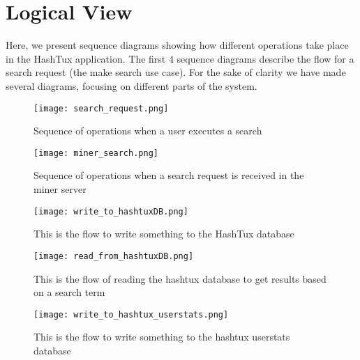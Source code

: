 \chapter{Logical View}
Here, we present sequence diagrams showing how different operations take place
in the HashTux application. \newline
The first 4 sequence diagrams describe the flow for a search request (the make
search use case). For the sake of clarity we have made several diagrams,
focusing on different parts of the system.
\newpage
\begin{figure}[ht]
  \centering
  \texttt{[image: search\_request.png]}
  \caption{Sequence of operations when a user executes a search}
\end{figure}
\newpage
\begin{figure}[ht]
  \centering
  \texttt{[image: miner\_search.png]}
  \caption{Sequence of operations when a search request is received in the miner
     server}
\end{figure}
\newpage
\begin{figure}[ht]
  \centering
  \texttt{[image: write\_to\_hashtuxDB.png]}
  \caption{This is the flow to write something to the HashTux database}
\end{figure}
\begin{figure}[ht]
  \centering
  \texttt{[image: read\_from\_hashtuxDB.png]}
  \caption{This is the flow of reading the hashtux database to get results based
     on a search term}
\end{figure}
\begin{figure}[ht]
  \centering
  \texttt{[image: write\_to\_hashtux\_userstats.png]}
  \caption{This is the flow to write something to the hashtux\textunderscore
     userstats database}
\end{figure}
